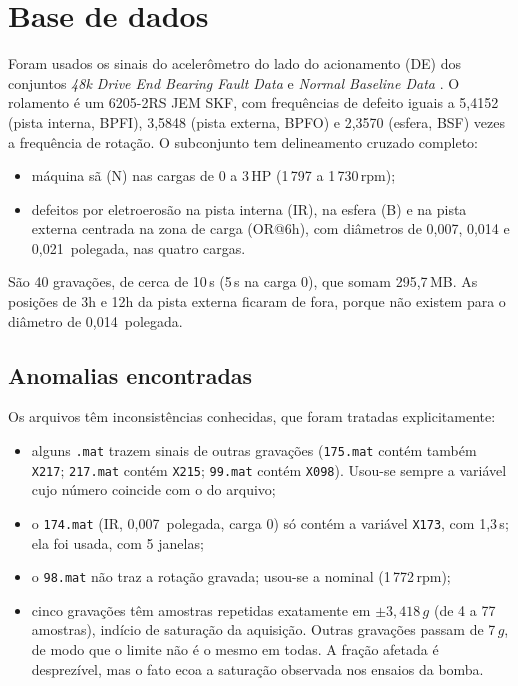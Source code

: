 \documentclass[12pt]{article}
\begin{document}
\section{Base de dados}
\label{sec:dados}

Foram usados os sinais do acelerômetro do lado do acionamento (DE) dos conjuntos \textit{48k Drive End Bearing Fault Data} e \textit{Normal Baseline Data} \cite{cwru}. O rolamento é um 6205-2RS JEM SKF, com frequências de defeito iguais a 5,4152 (pista interna, BPFI), 3,5848 (pista externa, BPFO) e 2,3570 (esfera, BSF) vezes a frequência de rotação. O subconjunto tem delineamento cruzado completo:
\begin{itemize}
	\item máquina sã (N) nas cargas de 0 a 3\,HP (1\,797 a 1\,730\,rpm);
	\item defeitos por eletroerosão na pista interna (IR), na esfera (B) e na pista externa centrada na zona de carga (OR@6h), com diâmetros de 0,007, 0,014 e 0,021~polegada, nas quatro cargas.
\end{itemize}
São 40 gravações, de cerca de 10\,s (5\,s na carga 0), que somam 295,7\,MB. As posições de 3h e 12h da pista externa ficaram de fora, porque não existem para o diâmetro de 0,014~polegada.

\subsection{Anomalias encontradas}

Os arquivos têm inconsistências conhecidas, que foram tratadas explicitamente:
\begin{itemize}
	\item alguns \texttt{.mat} trazem sinais de outras gravações (\texttt{175.mat} contém também \texttt{X217}; \texttt{217.mat} contém \texttt{X215}; \texttt{99.mat} contém \texttt{X098}). Usou-se sempre a variável cujo número coincide com o do arquivo;
	\item o \texttt{174.mat} (IR, 0,007~polegada, carga 0) só contém a variável \texttt{X173}, com 1,3\,s; ela foi usada, com 5 janelas;
	\item o \texttt{98.mat} não traz a rotação gravada; usou-se a nominal (1\,772\,rpm);
	\item cinco gravações têm amostras repetidas exatamente em \(\pm 3{,}418\,g\) (de 4 a 77 amostras), indício de saturação da aquisição. Outras gravações passam de 7\,\(g\), de modo que o limite não é o mesmo em todas. A fração afetada é desprezível, mas o fato ecoa a saturação observada nos ensaios da bomba.
\end{itemize}
\end{document}
